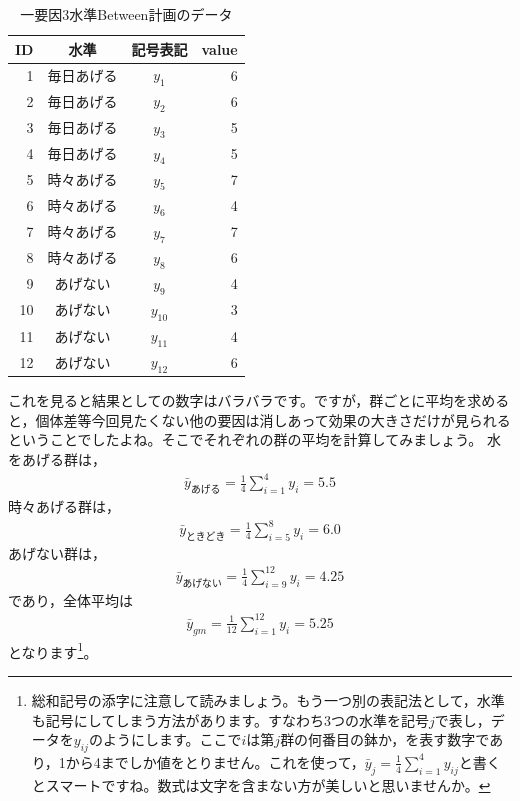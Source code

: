 \documentclass{ltjbook}
\begin{document}
\begin{table}[ht]
	\centering
	\caption{一要因3水準Between計画のデータ}
	\begin{tabular}{rccr}
		\hline
		ID & 水準    & 記号表記     & value \\
		\hline
		1  & 毎日あげる & $y_{1}$  & 6     \\
		2  & 毎日あげる & $y_{2}$  & 6     \\
		3  & 毎日あげる & $y_{3}$  & 5     \\
		4  & 毎日あげる & $y_{4}$  & 5     \\
		5  & 時々あげる & $y_{5}$  & 7     \\
		6  & 時々あげる & $y_{6}$  & 4     \\
		7  & 時々あげる & $y_{7}$  & 7     \\
		8  & 時々あげる & $y_{8}$  & 6     \\
		9  & あげない  & $y_{9}$  & 4     \\
		10 & あげない  & $y_{10}$ & 3     \\
		11 & あげない  & $y_{11}$ & 4     \\
		12 & あげない  & $y_{12}$ & 6     \\
		\hline
	\end{tabular}
	\label{tbl:18_01}
\end{table}

これを見ると結果としての数字はバラバラです。ですが，群ごとに平均を求めると，個体差等今回見たくない他の要因は消しあって効果の大きさだけが見られるということでしたよね。そこでそれぞれの群の平均を計算してみましょう。
水をあげる群は，
\begin{align}
\bar{y}_{あげる} =\frac{1}{4}\sum_{i=1}^4 y_i = 5.5
\end{align}
時々あげる群は，
\begin{align}
\bar{y}_{ときどき} = \frac{1}{4}\sum_{i=5}^8 y_i = 6.0
\end{align}
あげない群は，
\begin{align}
\bar{y}_{あげない} = \frac{1}{4}\sum_{i=9}^{12} y_i = 4.25
\end{align}
であり，全体平均は
\begin{align}
\bar{y}_{gm}= \frac{1}{12}\sum_{i=1}^{12} y_i = 5.25
\end{align}
となります\footnote{総和記号の添字に注意して読みましょう。もう一つ別の表記法として，水準も記号にしてしまう方法があります。すなわち3つの水準を記号$j$で表し，データを$y_{ij}$のようにします。ここで$i$は第$j$群の何番目の鉢か，を表す数字であり，1から4までしか値をとりません。これを使って，$\bar{y}_j = \frac{1}{4}\sum_{i=1}^4 y_{ij}$と書くとスマートですね。数式は文字を含まない方が美しいと思いませんか。}。
\end{document}
